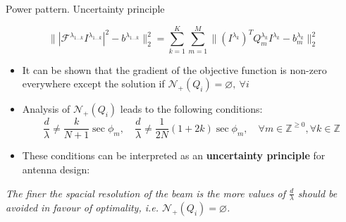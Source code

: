 \documentclass[../main.tex]{subfiles}
\begin{document}
\begin{frame}[t]{Power pattern. Uncertainty principle}

\begin{equation*}
\Big\| |\mathcal{F}^{\lambda_{1 \ldots k}} I^{\lambda_{1\ldots k}}|^2 - b^{\lambda_{1 \ldots k}} \Big\|_2^2 = \sum_{k=1}^K \sum_{m=1}^M \Big\| (I^{\lambda_{k}})^T Q^{\lambda_{k}}_m  I^{\lambda_{k}} - b^{\lambda_{k}}_m \Big\|_2^2
\end{equation*}


 
\begin{itemize}
	\item It can be shown that the gradient of the objective function is non-zero everywhere except the solution if $\mathcal{N}_{+}(Q_i) = \varnothing, ~\forall i$
	\item Analysis of $\mathcal{N}_{+}(Q_i)$ leads to the following conditions:
	\begin{equation*}
  \frac{d}{\lambda} \neq \frac{k}{N+1} \sec \phi_m , \quad \frac{d}{\lambda} \neq \frac{1}{2N} (1 + 2k) \sec \phi_m, \quad \forall m \in \mathbb{Z}^{\ge 0}, \forall k \in \mathbb{Z}
  \label{antenna_design_condition}
	\end{equation*}
	\item These conditions can be interpreted as an \textbf{uncertainty principle} for antenna design: 
\end{itemize}

\begin{center}
\begin{tcolorbox}
\textit{The finer the spacial resolution of the beam is the more values of $\frac{d}{\lambda}$ should be avoided in favour of optimality, i.e. $\mathcal{N}_{+}(Q_i) = \varnothing$.}
\end{tcolorbox}
\end{center}

\end{frame}
\end{document}
